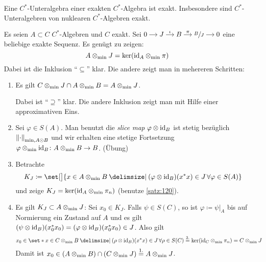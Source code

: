 \begin{satz}[{name={Kirchberg, Wassermann}}]
	Eine $C^*$-Unteralgebra einer exakten $C^*$-Algebra ist exakt.
	Insbesondere sind $C^*$-Unteralgebren von nuklearen $C^*$-Algebren exakt.
\end{satz}
\begin{beweis}[Idee]
	Es seien $A \subset C$ $C^*$-Algebren und $C$ exakt.
	Sei \(
		\begin{tikzcd}[cramped,sep=small]
			0 \rar & J \rar["\iota"] & B \rar["\pi"] & \sfrac{B}{J} \rar & 0
		\end{tikzcd}
	\) eine beliebige exakte Sequenz.
	Es genügt zu zeigen: 
	\[
		A \tensormin J = \ker \enbrace*{{\id_A} \tensormin \pi}
	\]
	Dabei ist die Inklusion \enquote{$\subseteq$} klar.
	Die andere zeigt man in mehereren Schritten:
	\begin{enumerate}[1.]
		\item Es gilt $C \tensormin J \cap A \tensormin B = A \tensormin J$.
		
		Dabei ist \enquote{$\supseteq$} klar. 
		Die andere Inklusion zeigt man mit Hilfe einer approximativen Eins.
		\item Sei $\varphi \in S(A)$. 
		Man benutzt die \emph{slice map}
		$\varphi \otimes {\id_B}$ ist stetig bezüglich $\norm*{\cdot}_{{\min}, A \odot B}$ und wir erhalten eine stetige Fortsetzung $\varphi \tensormin  {\id_B} \colon A \tensormin B \to B$. (Übung)
		\item Betrachte 
		\[
			K_J \coloneqq \set[\big]{x \in A \tensormin B \given (\varphi \otimes {\id_B})(x^* x) \in J \, \forall \varphi \in S(A)}
		\]
		und zeige $K_J = \ker \enbrace*{{\id_A} \tensormin \pi_n}$ (benutze \autoref{satz:120}).
		\item Es gilt $K_J \subset A \tensormin J$:
		Sei $x_0 \in K_J$.
		Falls $\psi \in S(C)$, so ist $\varphi \coloneqq \psi|_A$ bis auf Normierung ein Zustand auf $A$ und es gilt $(\psi \otimes {\id_B})(x_0^*x_0) = (\varphi \otimes {\id_B})(x_0^* x_0) \in J$.
		Also gilt
		\[
			x_0 \in \set*{x \in C \tensormin B \given (\rho \otimes {\id_B})(x^*x) \in J \, \forall \rho \in S(C)} \StackText{3.}{=} \ker \enbrace*{{\id_C} \tensormin \pi_n} = C \tensormin J
		\]
		Damit ist $x_0 \in \enbrace*{A \tensormin B} \cap \enbrace*{C \tensormin J} \StackText{1.}{=} A \tensormin J$.\qedhere
	\end{enumerate}
\end{beweis}
\newpage

